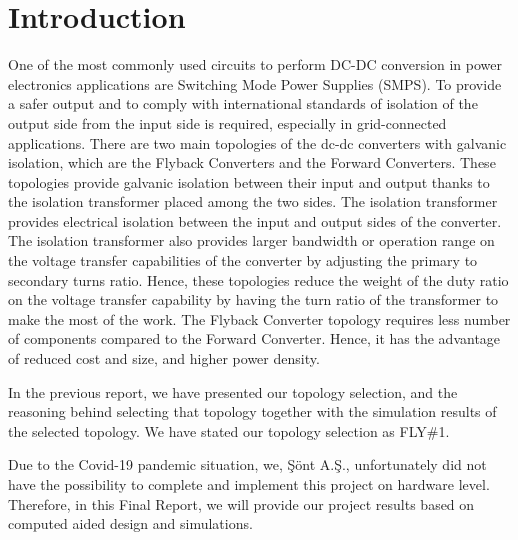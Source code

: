 \section{Introduction}

One of the most commonly used circuits to perform DC-DC conversion in power electronics applications are Switching Mode Power Supplies (SMPS). To provide a safer output and to comply with international standards of isolation of the output side from the input side is required, especially in grid-connected applications. There are two main topologies of the dc-dc converters with galvanic isolation, which are the Flyback Converters and the Forward Converters. These topologies provide galvanic isolation between their input and output thanks to the isolation transformer placed among the two sides. The isolation transformer provides electrical isolation between the input and output sides of the converter. The isolation transformer also provides larger bandwidth or operation range on the voltage transfer capabilities of the converter by adjusting the primary to secondary turns ratio. Hence, these topologies reduce the weight of the duty ratio on the voltage transfer capability by having the turn ratio of the transformer to make the most of the work. The Flyback Converter topology requires less number of components compared to the Forward Converter. Hence, it has the advantage of reduced cost and size, and higher power density. 

In the previous report, we have presented our topology selection, and the reasoning behind selecting that topology together with the simulation results of the selected topology. We have stated our topology selection as FLY\#1.

Due to the Covid-19 pandemic situation, we, Şönt A.Ş., unfortunately did not have the possibility to complete and implement this project on hardware level. Therefore, in this Final Report, we will provide our project results based on computed aided design and simulations.

